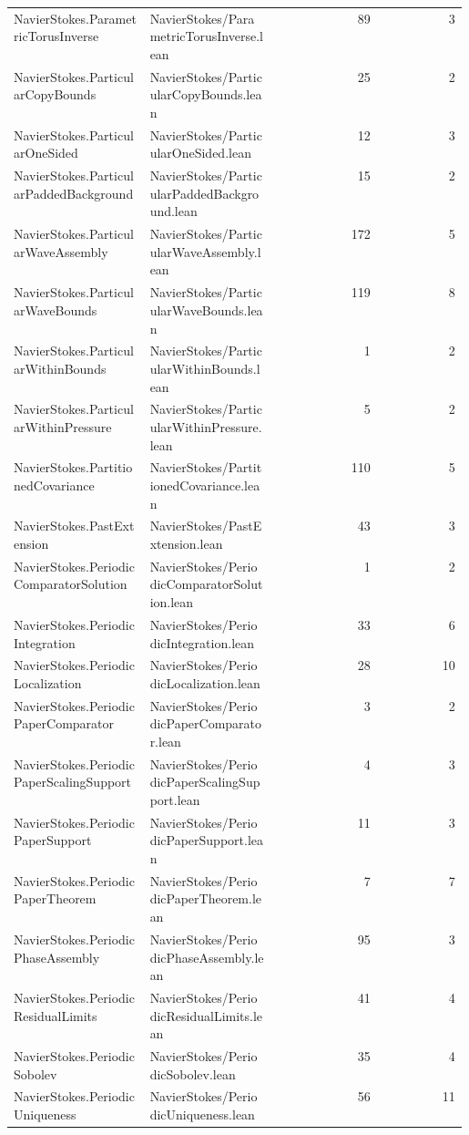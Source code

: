 \begin{longtable}{p{0.30\linewidth}p{0.28\linewidth}rr}
NavierStokes.ParametricTorusInverse & NavierStokes/ParametricTorusInverse.lean & 89 & 3\\
NavierStokes.ParticularCopyBounds & NavierStokes/ParticularCopyBounds.lean & 25 & 2\\
NavierStokes.ParticularOneSided & NavierStokes/ParticularOneSided.lean & 12 & 3\\
NavierStokes.ParticularPaddedBackground & NavierStokes/ParticularPaddedBackground.lean & 15 & 2\\
NavierStokes.ParticularWaveAssembly & NavierStokes/ParticularWaveAssembly.lean & 172 & 5\\
NavierStokes.ParticularWaveBounds & NavierStokes/ParticularWaveBounds.lean & 119 & 8\\
NavierStokes.ParticularWithinBounds & NavierStokes/ParticularWithinBounds.lean & 1 & 2\\
NavierStokes.ParticularWithinPressure & NavierStokes/ParticularWithinPressure.lean & 5 & 2\\
NavierStokes.PartitionedCovariance & NavierStokes/PartitionedCovariance.lean & 110 & 5\\
NavierStokes.PastExtension & NavierStokes/PastExtension.lean & 43 & 3\\
NavierStokes.PeriodicComparatorSolution & NavierStokes/PeriodicComparatorSolution.lean & 1 & 2\\
NavierStokes.PeriodicIntegration & NavierStokes/PeriodicIntegration.lean & 33 & 6\\
NavierStokes.PeriodicLocalization & NavierStokes/PeriodicLocalization.lean & 28 & 10\\
NavierStokes.PeriodicPaperComparator & NavierStokes/PeriodicPaperComparator.lean & 3 & 2\\
NavierStokes.PeriodicPaperScalingSupport & NavierStokes/PeriodicPaperScalingSupport.lean & 4 & 3\\
NavierStokes.PeriodicPaperSupport & NavierStokes/PeriodicPaperSupport.lean & 11 & 3\\
NavierStokes.PeriodicPaperTheorem & NavierStokes/PeriodicPaperTheorem.lean & 7 & 7\\
NavierStokes.PeriodicPhaseAssembly & NavierStokes/PeriodicPhaseAssembly.lean & 95 & 3\\
NavierStokes.PeriodicResidualLimits & NavierStokes/PeriodicResidualLimits.lean & 41 & 4\\
NavierStokes.PeriodicSobolev & NavierStokes/PeriodicSobolev.lean & 35 & 4\\
NavierStokes.PeriodicUniqueness & NavierStokes/PeriodicUniqueness.lean & 56 & 11\\

\end{longtable}
